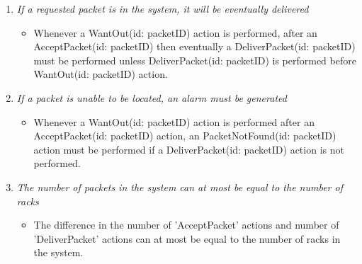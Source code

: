 \begin{enumerate}
\item \textit{If a requested packet is in the system, it will be
	eventually delivered}
	\begin{itemize}
	\item Whenever a WantOut(id: packetID) action is performed, after an AcceptPacket(id: 
	packetID) then eventually a DeliverPacket(id: packetID) must be
	performed unless DeliverPacket(id: packetID) is performed before WantOut(id: packetID) action. 
	\end{itemize}
	
\item \textit{If a packet is unable to be located, an alarm must 
	be generated}
	\begin{itemize}	
	\item  Whenever a WantOut(id: packetID) action is performed after an 
	AcceptPacket(id: packetID) action, an PacketNotFound(id: packetID) action must be performed if a 
	DeliverPacket(id: packetID) action is not performed.
	\end{itemize}
		
\item \textit{The number of packets in the system can at most be equal to the number of racks}
	\begin{itemize}
	\item The difference in the number of 'AcceptPacket'
	actions and number of 'DeliverPacket' actions can at most be 
	equal to the number of racks in the system.
	\end{itemize}
\end{enumerate}
